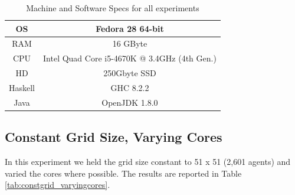 \begin{table}
	\centering
	\begin{tabular}{ c || c }
		OS & Fedora 28 64-bit \\ \hline
		RAM & 16 GByte \\ \hline
		CPU & Intel Quad Core i5-4670K @ 3.4GHz (4th Gen.) \\ \hline
		HD & 250Gbyte SSD \\ \hline
		Haskell & GHC 8.2.2 \\ \hline
		Java & OpenJDK 1.8.0
	\end{tabular}
	
	\caption{Machine and Software Specs for all experiments}
	\label{tab:machine_specs}
\end{table}

\subsection{Constant Grid Size, Varying Cores}
In this experiment we held the grid size constant to 51 x 51 (2,601 agents) and varied the cores where possible. The results are reported in Table \ref{tab:constgrid_varyingcores}.

